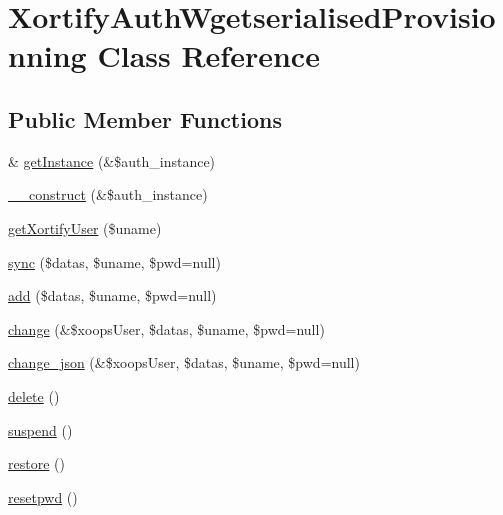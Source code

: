 \hypertarget{class_xortify_auth_wgetserialised_provisionning}{\section{Xortify\-Auth\-Wgetserialised\-Provisionning Class Reference}
\label{class_xortify_auth_wgetserialised_provisionning}
}
\subsection*{Public Member Functions}
\begin{DoxyCompactItemize}
\item 
\& \hyperlink{class_xortify_auth_wgetserialised_provisionning_a2c8eaa915c70d75289ac8a03686194f9}{get\-Instance} (\&\$auth\-\_\-instance)
\item 
\hyperlink{class_xortify_auth_wgetserialised_provisionning_a0f25832dc86774e7605b81fe57b083c2}{\-\_\-\-\_\-construct} (\&\$auth\-\_\-instance)
\item 
\hyperlink{class_xortify_auth_wgetserialised_provisionning_a041d726ac26672547ed1504e8e0117aa}{get\-Xortify\-User} (\$uname)
\item 
\hyperlink{class_xortify_auth_wgetserialised_provisionning_a35dc08b0f2138eb818ff95345b73bcff}{sync} (\$datas, \$uname, \$pwd=null)
\item 
\hyperlink{class_xortify_auth_wgetserialised_provisionning_adfc9fcef01e7bd7b2f47e8e79d51fc63}{add} (\$datas, \$uname, \$pwd=null)
\item 
\hyperlink{class_xortify_auth_wgetserialised_provisionning_ae1f0971b9712c794620cf309164e43af}{change} (\&\$xoops\-User, \$datas, \$uname, \$pwd=null)
\item 
\hyperlink{class_xortify_auth_wgetserialised_provisionning_a94f4e0408f26e65abca347ec883f4ec9}{change\-\_\-json} (\&\$xoops\-User, \$datas, \$uname, \$pwd=null)
\item 
\hyperlink{class_xortify_auth_wgetserialised_provisionning_a13bdffdd926f26b825ea57066334ff01}{delete} ()
\item 
\hyperlink{class_xortify_auth_wgetserialised_provisionning_ad73006a505121228f3b075c2409787d2}{suspend} ()
\item 
\hyperlink{class_xortify_auth_wgetserialised_provisionning_aa1371f22826cf8cde4454c9b467203d0}{restore} ()
\item 
\hyperlink{class_xortify_auth_wgetserialised_provisionning_a06d70fbd3a2db390b6f2530c0076628e}{resetpwd} ()
\end{DoxyCompactItemize}
